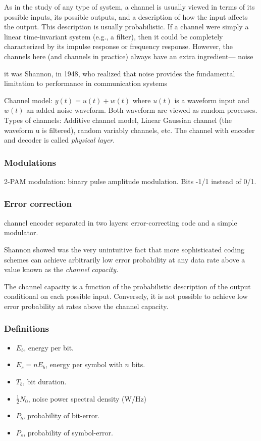 \documentclass[12pt,a4paper]{report}
\begin{document}
	As in the study of any type of system, a channel is usually viewed in terms of its possible inputs,
its possible outputs, and a description of how the input affects the output. This description is
usually probabilistic. If a channel were simply a linear time-invariant system (e.g., a filter), then
it could be completely characterized by its impulse response or frequency response. However,
the channels here (and channels in practice) always have an extra ingredient— noise


	it was Shannon, in 1948, who realized that noise provides
the fundamental limitation to performance in communication systems


	Channel model: $ y(t) = u(t) + w(t) $
	where $u(t)$ is a waveform input and $w(t)$ an added noise waveform. Both waveform are viewed as random processes.
	Types of channels: Additive channel model, Linear Gaussian channel (the waveform u is filtered), random variably channels, etc.
	The channel with encoder and decoder is called \textit{physical layer}.
	
	\subsubsection*{Modulations}
	
	2-PAM modulation: binary pulse amplitude modulation. Bits -1/1 instead of 0/1.
	
	\subsubsection{Error correction}
	
	channel encoder separated in two layers: error-correcting code and a simple modulator.
	
	Shannon showed was the very unintuitive fact that more sophisticated coding schemes can
achieve arbitrarily low error probability at any data rate above a value known as the \textit{channel capacity.}

	The channel capacity is a function of the probabilistic description of the output conditional on each possible input. Conversely, it is not possible to achieve low error probability at rates above the channel capacity.
	
	
	\subsubsection{Definitions}
	\begin{itemize}
	\item $E_{b}$, energy per bit.
	\item $E_{s}=nE_{b}$, energy per symbol with $n$ bits.
	\item $T_{b}$, bit duration.
	\item $\frac{1}{2}N_{0}$, noise power spectral density (W/Hz)
	\item $P_{b}$, probability of bit-error.
	\item $P_{s}$, probability of symbol-error.
	\end{itemize}
	
\end{document}
